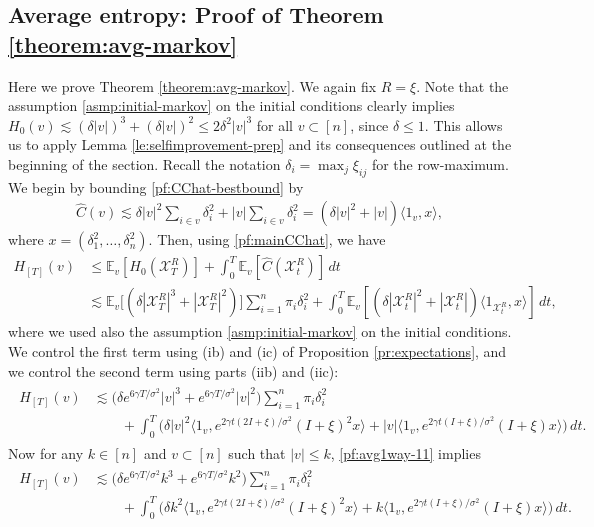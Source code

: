 \documentclass[11pt,reqno]{amsart}
\numberwithin{equation}{section}
\theoremstyle{definition}
\def\CC{{C}}
\def\E{{\mathbb E}}
\def\X{{\mathcal X}}
\begin{document}
\subsection{Average entropy: Proof of Theorem  \ref{theorem:avg-markov}}

Here we prove Theorem \ref{theorem:avg-markov}. We again fix $R = \xi$. Note that the assumption \eqref{asmp:initial-markov} on the initial conditions clearly implies $H_0(v) \lesssim(\delta |v|)^3 + (\delta |v|)^2 \le 2\delta^2|v|^3$ for all $ v \subset [n]$, since $\delta \le 1$. This allows us to apply Lemma \ref{le:selfimprovement-prep} and its consequences outlined at the beginning of the section.
Recall the notation $\delta_i=\max_j \xi_{ij}$ for the row-maximum. We begin by bounding \eqref{pf:CChat-bestbound} by
\begin{align*}
	\widehat{\CC}(v) \lesssim \delta|v|^2 \sum_{i \in v}\delta_i^2 + |v|\sum_{i \in v}\delta_i^2 = (\delta|v|^2+|v|)\langle 1_v,x\rangle,
\end{align*}
where $x=(\delta^2_1,\ldots,\delta^2_n)$. Then, using \eqref{pf:mainCChat}, we have
\begin{align*}
	H_{[T]}(v) &\le \E_v[H_0(\X_T^{R})] + \int_0^T \E_v[\widehat{\CC}(\X_t^{R})]\,dt  \\
	&\lesssim \E_v\Big[(\delta |\X_T^{R}|^3 + |\X_T^{R}|^2) \Big]  \sum_{i=1}^n \pi_i \delta_i^2  + \int_0^T \E_v[(\delta|\X_t^{R}|^2+|\X_t^{R}|)\langle 1_{\X_t^{R}},x\rangle]\,dt,
\end{align*}
where we used also the assumption \eqref{asmp:initial-markov} on the initial conditions.
We control the first term using (ib) and (ic) of Proposition \ref{pr:expectations}, and we control the second term using parts (iib) and (iic):
\begin{align}
	\begin{split}
		H_{[T]}(v)
		&\lesssim \big(\delta e^{6\gamma T/\sigma^2} |v|^3 + e^{6\gamma T/\sigma^2} |v|^2\big)  \sum_{i=1}^n \pi_i \delta_i^2  \\
		&\qquad + \int_0^T \bigg(\delta |v|^2 \big\langle 1_v, e^{2\gamma t (2I+\xi)/\sigma^2}(I+\xi)^2 x\big\rangle + |v| \big\langle 1_v,  e^{2\gamma t (I+\xi)/\sigma^2}(I+\xi) x \big\rangle \bigg)\,dt.
	\end{split} \label{pf:avg1way-11}
\end{align}
Now for any $ k \in [n]$ and $v\subset[n]$ such that $|v| \le k$, 	\eqref{pf:avg1way-11} implies
\begin{align}
	\begin{split}
		H_{[T]}(v)
		&\lesssim \big(\delta e^{6\gamma T/\sigma^2} k^3 + e^{6\gamma T/\sigma^2} k^2\big) \sum_{i=1}^n \pi_i \delta_i^2 \\
		&\qquad + \int_0^T \bigg(\delta k^2 \big\langle 1_v, e^{2\gamma t (2I+\xi)/\sigma^2}(I+\xi)^2 x\big\rangle + k\big\langle 1_v,  e^{2\gamma t (I+\xi)/\sigma^2}(I+\xi) x \big\rangle \bigg)\,dt.
	\end{split} \label{pf:avg1way-11-markov}
\end{align}
\end{document}
